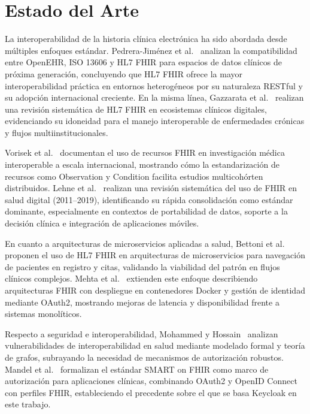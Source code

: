 \documentclass[conference]{IEEEtran}
\begin{document}
\section{Estado del Arte}

La interoperabilidad de la historia cl\'inica electr\'onica ha sido
abordada desde m\'ultiples enfoques est\'andar. Pedrera-Jim\'enez
et al.~\cite{b5_sec} analizan la compatibilidad entre OpenEHR, ISO
13606 y HL7 FHIR para espacios de datos cl\'inicos de pr\'oxima
generaci\'on, concluyendo que HL7 FHIR ofrece la mayor interoperabilidad
pr\'actica en entornos heterog\'eneos por su naturaleza RESTful y su
adopci\'on internacional creciente. En la misma l\'inea, Gazzarata
et al.~\cite{b3} realizan una revisi\'on sistem\'atica de HL7 FHIR
en ecosistemas cl\'inicos digitales, evidenciando su idoneidad para
el manejo interoperable de enfermedades cr\'onicas y flujos multiinstitucionales.

Vorisek et al.~\cite{b2} documentan el uso de recursos FHIR en
investigaci\'on m\'edica interoperable a escala internacional, mostrando
c\'omo la estandarizaci\'on de recursos como Observation y Condition
facilita estudios multicoh\'orten distribuidos. Lehne et al.~\cite{blehne}
realizan una revisi\'on sistem\'atica del uso de FHIR en salud digital
(2011--2019), identificando su r\'apida consolidaci\'on como est\'andar
dominante, especialmente en contextos de portabilidad de datos, soporte
a la decisi\'on cl\'inica e integraci\'on de aplicaciones m\'oviles.

En cuanto a arquitecturas de microservicios aplicadas a salud, Bettoni
et al.~\cite{b4} proponen el uso de HL7 FHIR en arquitecturas de
microservicios para navegaci\'on de pacientes en registro y citas,
validando la viabilidad del patr\'on en flujos cl\'inicos complejos.
Mehta et al.~\cite{bmehta} extienden este enfoque describiendo
arquitecturas FHIR con despliegue en contenedores Docker y gesti\'on
de identidad mediante OAuth2, mostrando mejoras de latencia y
disponibilidad frente a sistemas monol\'iticos.

Respecto a seguridad e interoperabilidad, Mohammed y Hossain~\cite{b5}
analizan vulnerabilidades de interoperabilidad en salud mediante
modelado formal y teor\'ia de grafos, subrayando la necesidad de
mecanismos de autorizaci\'on robustos. Mandel et al.~\cite{bsmart}
formalizan el est\'andar SMART on FHIR como marco de autorizaci\'on
para aplicaciones cl\'inicas, combinando OAuth2 y OpenID Connect con
perfiles FHIR, estableciendo el precedente sobre el que se basa
Keycloak en este trabajo.
\end{document}
